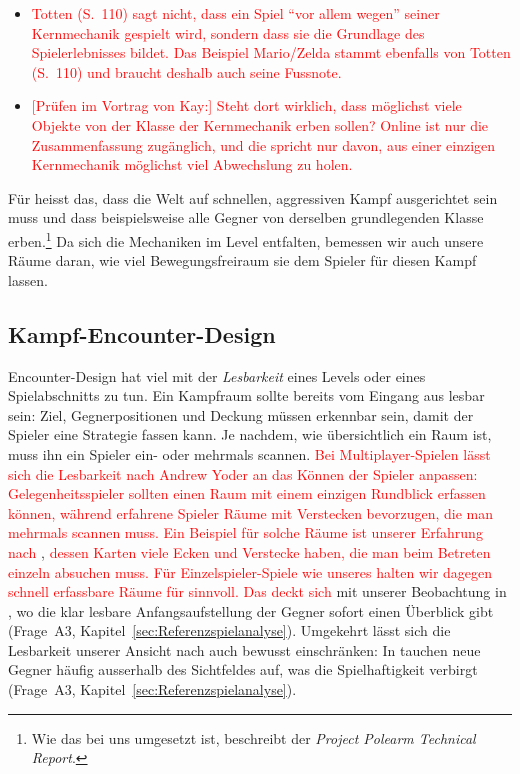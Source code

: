 \documentclass[../Main.tex]{subfiles}
\begin{document}
\begin{itemize}[leftmargin=1.5cm]
    \item \textcolor{red}{Totten (S.~110) sagt nicht, dass ein Spiel \enquote{vor allem wegen} seiner Kernmechanik gespielt wird, sondern dass sie die Grundlage des Spielerlebnisses bildet. Das Beispiel Mario/Zelda stammt ebenfalls von Totten (S.~110) und braucht deshalb auch seine Fussnote.}
    \item \textcolor{red}{[Prüfen im Vortrag von Kay:] Steht dort wirklich, dass möglichst viele Objekte von der Klasse der Kernmechanik erben sollen? Online ist nur die Zusammenfassung zugänglich, und die spricht nur davon, aus einer einzigen Kernmechanik möglichst viel Abwechslung zu holen.}
\end{itemize}

Für  heisst das, dass die Welt auf schnellen, aggressiven Kampf ausgerichtet sein muss und dass beispielsweise alle Gegner von derselben grundlegenden Klasse erben.\footnote{Wie das bei uns umgesetzt ist, beschreibt der \textit{Project Polearm Technical Report}.} Da sich die Mechaniken im Level entfalten, bemessen wir auch unsere Räume daran, wie viel Bewegungsfreiraum sie dem Spieler für diesen Kampf lassen.

\subsection{Kampf-Encounter-Design} \label{sec:Encounter}
Encounter-Design hat viel mit der \textit{Lesbarkeit} eines Levels oder eines Spielabschnitts zu tun. Ein Kampfraum sollte bereits vom Eingang aus lesbar sein: Ziel, Gegnerpositionen und Deckung müssen erkennbar sein, damit der Spieler eine Strategie fassen kann.\autocite{gdc_horizonquests2018} Je nachdem, wie übersichtlich ein Raum ist, muss ihn ein Spieler ein- oder mehrmals scannen. \textcolor{red}{Bei Multiplayer-Spielen lässt sich die Lesbarkeit nach Andrew Yoder an das Können der Spieler anpassen: Gelegenheitsspieler sollten einen Raum mit einem einzigen Rundblick erfassen können, während erfahrene Spieler Räume mit Verstecken bevorzugen, die man mehrmals scannen muss.}\autocite[122--123]{totten2014architectural} \textcolor{red}{Ein Beispiel für solche Räume ist unserer Erfahrung nach} ,\autocite{valve_counterstrike_2000} \textcolor{red}{dessen Karten viele Ecken und Verstecke haben, die man beim Betreten einzeln absuchen muss. Für Einzelspieler-Spiele wie unseres halten wir dagegen schnell erfassbare Räume für sinnvoll. Das deckt sich} mit unserer Beobachtung in , wo die klar lesbare Anfangsaufstellung der Gegner sofort einen Überblick gibt (Frage~A3, Kapitel~\ref{sec:Referenzspielanalyse}). Umgekehrt lässt sich die Lesbarkeit unserer Ansicht nach auch bewusst einschränken: In  tauchen neue Gegner häufig ausserhalb des Sichtfeldes auf, was die Spielhaftigkeit verbirgt (Frage~A3, Kapitel~\ref{sec:Referenzspielanalyse}).
\end{document}
